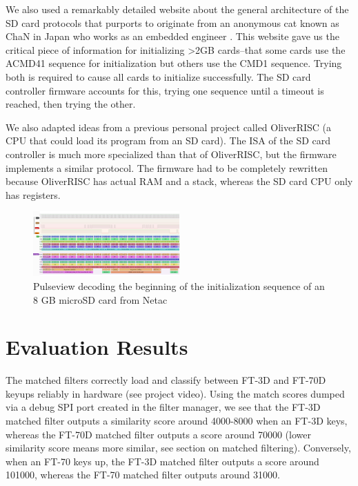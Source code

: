 \documentclass[conference]{IEEEtran}
\begin{document}
We also used a remarkably detailed website about the general architecture of the SD card protocols that purports to originate from an anonymous cat known as ChaN in Japan who works as an embedded engineer \cite{b2}. This website gave us the critical piece of information for initializing \textgreater 2GB cards--that some cards use the ACMD41 sequence for initialization but others use the CMD1 sequence. Trying both is required to cause all cards to initialize successfully. The SD card controller firmware accounts for this, trying one sequence until a timeout is reached, then trying the other.

We also adapted ideas from a previous personal project called OliverRISC (a CPU that could load its program from an SD card). The ISA of the SD card controller is much more specialized than that of OliverRISC, but the firmware implements a similar protocol. The firmware had to be completely rewritten because OliverRISC has actual RAM and a stack, whereas the SD card CPU only has registers.

\begin{figure}
    \centerline{\includegraphics[width=0.5\textwidth]{Pulseview.png}}
    \caption{Pulseview decoding the beginning of the initialization sequence of an 8 GB microSD card from Netac}
    \label{pulseview}
\end{figure}

\section{Evaluation Results}

The matched filters correctly load and classify between FT-3D and FT-70D keyups reliably in hardware (see project video). Using the match scores dumped via a debug SPI port created in the filter manager, we see that the FT-3D matched filter outputs a similarity score around 4000-8000 when an FT-3D keys, whereas the FT-70D matched filter outputs a score around 70000 (lower similarity score means more similar, see section on matched filtering). Conversely, when an FT-70 keys up, the FT-3D matched filter outputs a score around 101000, whereas the FT-70 matched filter outputs around 31000.
\end{document}
